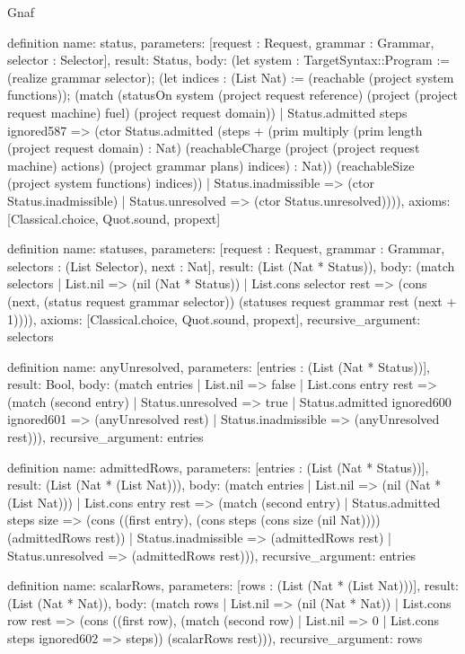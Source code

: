 \begin{lexlean}{Gnaf}
\begin{semanticmodule}
definition{
  name: status,
  parameters: [request : Request, grammar : Grammar, selector : Selector],
  result: Status,
  body: (let system : TargetSyntax::Program := (realize grammar selector); (let indices : (List Nat) := (reachable (project system functions)); (match (statusOn system (project request reference) (project (project request machine) fuel) (project request domain))
    | Status.admitted steps ignored587 => (ctor Status.admitted (steps + (prim multiply (prim length (project request domain) : Nat) (reachableCharge (project (project request machine) actions) (project grammar plans) indices) : Nat)) (reachableSize (project system functions) indices))
    | Status.inadmissible => (ctor Status.inadmissible)
    | Status.unresolved => (ctor Status.unresolved)))),
  axioms: [Classical.choice, Quot.sound, propext]
}

definition{
  name: statuses,
  parameters: [request : Request, grammar : Grammar, selectors : (List Selector), next : Nat],
  result: (List (Nat * Status)),
  body: (match selectors
    | List.nil => (nil (Nat * Status))
    | List.cons selector rest => (cons (next, (status request grammar selector)) (statuses request grammar rest (next + 1)))),
  axioms: [Classical.choice, Quot.sound, propext],
  recursive_argument: selectors
}

definition{
  name: anyUnresolved,
  parameters: [entries : (List (Nat * Status))],
  result: Bool,
  body: (match entries
    | List.nil => false
    | List.cons entry rest => (match (second entry)
      | Status.unresolved => true
      | Status.admitted ignored600 ignored601 => (anyUnresolved rest)
      | Status.inadmissible => (anyUnresolved rest))),
  recursive_argument: entries
}

definition{
  name: admittedRows,
  parameters: [entries : (List (Nat * Status))],
  result: (List (Nat * (List Nat))),
  body: (match entries
    | List.nil => (nil (Nat * (List Nat)))
    | List.cons entry rest => (match (second entry)
      | Status.admitted steps size => (cons ((first entry), (cons steps (cons size (nil Nat)))) (admittedRows rest))
      | Status.inadmissible => (admittedRows rest)
      | Status.unresolved => (admittedRows rest))),
  recursive_argument: entries
}

definition{
  name: scalarRows,
  parameters: [rows : (List (Nat * (List Nat)))],
  result: (List (Nat * Nat)),
  body: (match rows
    | List.nil => (nil (Nat * Nat))
    | List.cons row rest => (cons ((first row), (match (second row)
      | List.nil => 0
      | List.cons steps ignored602 => steps)) (scalarRows rest))),
  recursive_argument: rows
}


\end{semanticmodule}
\end{lexlean}
